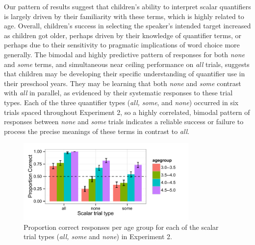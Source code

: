 \documentclass[10pt,letterpaper]{article}
\begin{document}
Our pattern of results suggest that children's ability to interpret scalar quantifiers is largely driven by their familiarity with these terms, which is highly related to age. Overall, children's success in selecting the speaker's intended target increased as children got older, perhaps driven by their knowledge of quantifier terms, or perhaps due to their sensitivity to pragmatic implications of word choice more generally. The bimodal and highly predictive pattern of responses for both \emph{none} and \emph{some} terms, and simultaneous near ceiling performance on \emph{all} trials, suggests that children may be developing their specific understanding of quantifier use in their preschool years. They may be learning that both \emph{none} and \emph{some} contrast with \emph{all} in parallel, as evidenced by their systematic responses to these trial types. Each of the three quantifier types (\emph{all, some}, and \emph{none}) occurred in six trials spaced throughout Experiment 2, so a highly correlated, bimodal pattern of responses between \emph{none} and \emph{some} trials indicates a reliable success or failure to process the precise meanings of these terms in contrast to \emph{all}.


\begin{figure}[t] 
  \begin{center} 
    \includegraphics[width=3.5in]{figures/implicatures_scalarOnly_clean.pdf} 
    \caption{\label{fig:expt2} Proportion correct responses per age group for each of the scalar trial types (\emph{all, some} and \emph{none}) in Experiment 2.     }
    \end{center} 
\end{figure}
\end{document}
